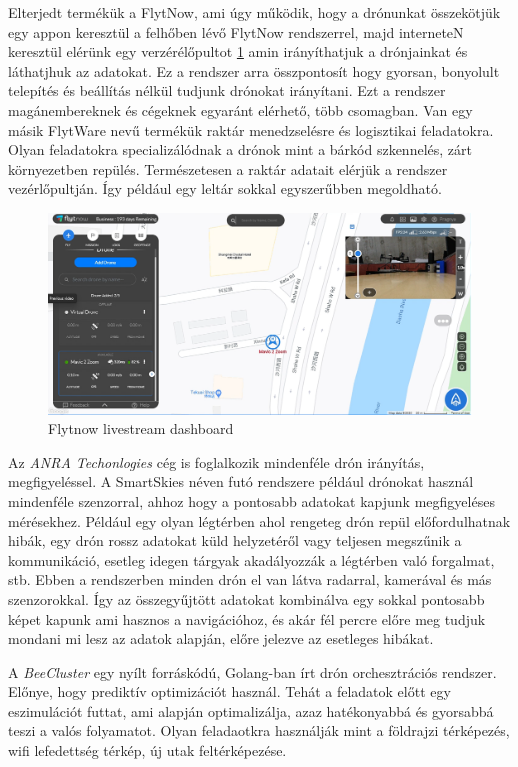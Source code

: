 Elterjedt termékük a FlytNow, ami úgy működik, hogy a drónunkat összekötjük egy appon keresztül a felhőben lévő FlytNow rendszerrel,
majd interneteN keresztül elérünk egy verzérélőpultot \ref{fig:flytdash} amin irányíthatjuk a drónjainkat és láthatjhuk az adatokat.
Ez a rendszer arra összpontosít hogy gyorsan, bonyolult telepítés és beállítás nélkül tudjunk drónokat irányítani.
Ezt a rendszer magánembereknek és cégeknek egyaránt elérhető, több csomagban.
Van egy másik FlytWare nevű termékük raktár menedzselésre és logisztikai feladatokra. Olyan feladatokra specializálódnak a drónok mint a bárkód szkennelés,
zárt környezetben repülés. Természetesen a raktár adatait elérjük a rendszer vezérlőpultján. Így például egy leltár sokkal egyszerűbben megoldható.


\begin{figure}[h]
    \centering
    \includegraphics[scale=0.3]{images/flyt-dashboard.png}
    \caption{Flytnow livestream dashboard}
    \label{fig:flytdash}
\end{figure}

Az \textit{ANRA Techonlogies}\cite{anra} cég is foglalkozik mindenféle drón irányítás, megfigyeléssel. A SmartSkies néven futó rendszere például drónokat használ mindenféle szenzorral,
ahhoz hogy a pontosabb adatokat kapjunk megfigyeléses mérésekhez. Például egy olyan légtérben ahol rengeteg drón repül előfordulhatnak hibák, egy drón rossz adatokat küld helyzetéről vagy
teljesen megszűnik a kommunikáció, esetleg idegen tárgyak akadályozzák a légtérben  való forgalmat, stb.
Ebben a rendszerben minden drón el van látva radarral, kamerával és más szenzorokkal. Így az összegyűjtött adatokat kombinálva
egy sokkal pontosabb képet kapunk ami hasznos a navigációhoz, és akár fél percre előre meg tudjuk mondani mi lesz az adatok alapján, előre jelezve az esetleges hibákat.


A \textit{BeeCluster}\cite{beecluster} egy nyílt forráskódú, Golang-ban írt drón orchesztrációs rendszer. Előnye, hogy prediktív optimizációt használ.
Tehát a feladatok előtt egy eszimulációt futtat, ami alapján optimalizálja, azaz hatékonyabbá és gyorsabbá teszi a valós folyamatot.
Olyan feladaotkra használják mint a földrajzi térképezés, wifi lefedettség térkép, új utak feltérképezése.


